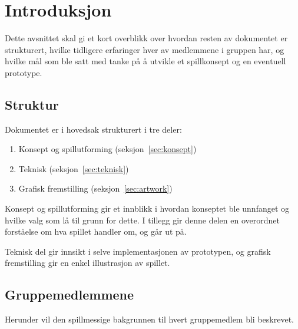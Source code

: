 \section{Introduksjon}\label{sec:intro}
Dette avsnittet skal gi et kort overblikk over hvordan resten av
dokumentet er strukturert, hvilke tidligere erfaringer hver av
medlemmene i gruppen har, og hvilke mål som ble satt med tanke på å
utvikle et spillkonsept og en eventuell prototype.

\subsection{Struktur}
Dokumentet er i hovedsak strukturert i tre deler:
\begin{enumerate}
	\item Konsept og spillutforming (seksjon~\ref{sec:konsept})
	\item Teknisk (seksjon~\ref{sec:teknisk})
	\item Grafisk fremstilling (seksjon~\ref{sec:artwork})
\end{enumerate}
Konsept og spillutforming gir et innblikk i hvordan konseptet ble unnfanget og hvilke
valg som lå til grunn for dette. I tillegg gir denne delen en overordnet
forståelse om hva spillet handler om, og går ut på.

Teknisk del gir innsikt i selve implementasjonen av prototypen, og grafisk fremstilling
gir en enkel illustrasjon av spillet.

\subsection{Gruppemedlemmene}
Herunder vil den spillmessige bakgrunnen til hvert gruppemedlem bli
beskrevet.

